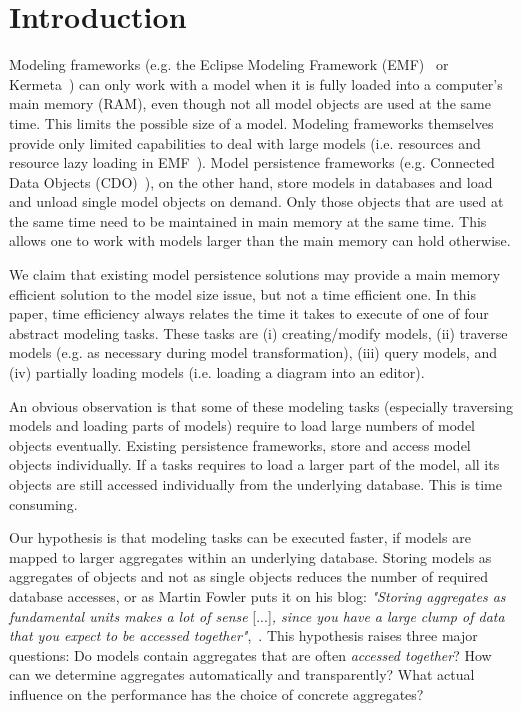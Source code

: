 \section{Introduction}

Modeling frameworks (e.g. the Eclipse Modeling Framework (EMF)~\cite{emf2009} or Kermeta~\cite{kermeta}) can only work with a model when it is fully loaded into a computer's main memory (RAM), even though not all model objects are used at the same time.
This limits the possible size of a model. 
Modeling frameworks themselves provide only limited capabilities to deal with large models (i.e. resources and resource lazy loading in EMF~\cite{emf2009}). 
Model persistence frameworks (e.g. Connected Data Objects (CDO)~\cite{cdo}), on the other hand, store models in databases and load and unload single model objects on demand. 
Only those objects that are used at the same time need to be maintained in main memory at the same time. This allows one to work with models larger than the main memory can hold otherwise. 

We claim that existing model persistence solutions may provide a main memory efficient solution to the model size issue, but not a time efficient one. In this paper, time efficiency always relates the time it takes to execute of one of four abstract modeling tasks. These tasks are (i) creating/modify models, (ii) traverse models (e.g. as necessary during model transformation), (iii) query models, and (iv) partially loading models (i.e. loading a diagram into an editor).

An obvious observation is that some of these modeling tasks (especially traversing models and loading parts of models) require to load large numbers of model objects eventually. Existing persistence frameworks, store and access model objects individually. If a tasks requires to load a larger part of the model, all its objects are still accessed individually from the underlying database. This is time consuming.

Our hypothesis is that modeling tasks can be executed faster, if models are mapped to larger aggregates within an underlying database. Storing models as aggregates of objects and not as single objects reduces the number of required database accesses, or as Martin Fowler puts it on his blog: \emph{"Storing aggregates as fundamental units makes a lot of sense} [...]\emph{, since you have a large clump of data that you expect to be accessed together"},~\cite{martinFowler}. This hypothesis raises three major questions: Do models contain aggregates that are often \emph{accessed together}? How can we determine aggregates automatically and transparently? What actual influence on the performance has the choice of concrete aggregates?

